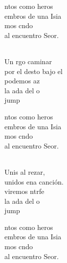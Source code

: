 \begin{cancion}%
	\begin{chorus}%
	ntos como heros\\
	embros de una Isia\\
	mos cndo\\
	al encuentro  Seor.\\
	\end{chorus}%
	\jump\\
	Un rgo caminar\\
	por el desto bajo el \\
	 podemos az\\
	 la ada del o \\jump\\
	\begin{chorus}%
	ntos como heros\\
	embros de una Isia\\
	mos cndo\\
	al encuentro  Seor.\\
	\end{chorus}%
	\jump\\
	Unis al rezar,\\
	unidos ena canción. \\
	viremos ntrfe\\
	 la ada del o \\jump\\
	\begin{chorus}%
	ntos como heros\\
	embros de una Isia\\
	mos cndo\\
	al encuentro  Seor.\\
	\end{chorus}%
	\jump\\

\end{cancion}
